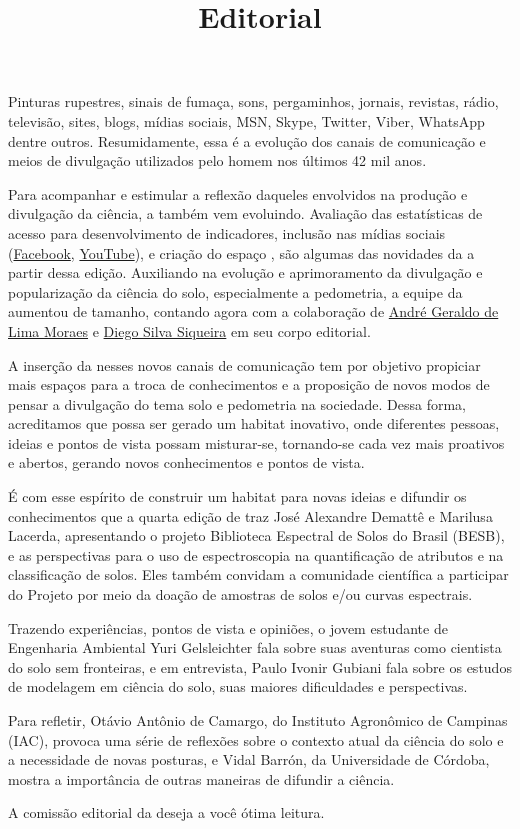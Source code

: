\title{Editorial}
\maketitle

Pinturas rupestres, sinais de fumaça, sons, pergaminhos, jornais, revistas, rádio, televisão, sites, blogs, mídias sociais, MSN, Skype, Twitter, Viber, WhatsApp dentre outros. Resumidamente, essa é a evolução dos canais de comunicação e meios de divulgação utilizados pelo homem nos últimos 42 mil anos. 

Para acompanhar e estimular a reflexão daqueles envolvidos na produção e divulgação da ciência, a \pedometria{} também vem evoluindo. Avaliação das estatísticas de acesso para desenvolvimento de indicadores, inclusão nas mídias sociais (\href{https://www.facebook.com/pedometrianews?fref=ts}{Facebook}, \href{https://www.youtube.com/channel/UCWf449Ctv5X5cZqYXmAojUg}{YouTube}), e criação do espaço \pedoartemetria, são algumas das novidades da \pedometria{} a partir dessa edição. Auxiliando na evolução e aprimoramento da divulgação e popularização da ciência do solo, especialmente a pedometria, a equipe da \pedometria{} aumentou de tamanho, contando agora com a colaboração de \href{http://lattes.cnpq.br/4230318899238716}{André Geraldo de Lima Moraes} e \href{http://lattes.cnpq.br/8836609544198735}{Diego Silva Siqueira} em seu corpo editorial.

A inserção da \pedometria{} nesses novos canais de comunicação tem por objetivo propiciar mais espaços para a troca de conhecimentos e a proposição de novos modos de pensar a divulgação do tema solo e pedometria na sociedade. Dessa forma, acreditamos que possa ser gerado um habitat inovativo, onde diferentes pessoas, ideias e pontos de vista possam misturar-se, tornando-se cada vez mais proativos e abertos, gerando novos conhecimentos e pontos de vista.

É com esse espírito de construir um habitat para novas ideias e difundir os conhecimentos que a quarta edição de \pedometria{} traz José Alexandre Demattê e Marilusa Lacerda, apresentando o projeto Biblioteca Espectral de Solos do Brasil (BESB), e as perspectivas para o uso de espectroscopia na quantificação de atributos e na classificação de solos. Eles também convidam a comunidade científica a participar do Projeto por meio da doação de amostras de solos e/ou curvas espectrais.

Trazendo experiências, pontos de vista e opiniões, o jovem estudante de Engenharia Ambiental Yuri Gelsleichter fala sobre suas aventuras como cientista do solo sem fronteiras, e em entrevista, Paulo Ivonir Gubiani fala sobre os estudos de modelagem em ciência do solo, suas maiores dificuldades e perspectivas.

Para refletir, Otávio Antônio de Camargo, do Instituto Agronômico de Campinas (IAC), provoca uma série de reflexões sobre o contexto atual da ciência do solo e a necessidade de novas posturas, e Vidal Barrón, da Universidade de Córdoba, mostra a importância de outras maneiras de difundir a ciência.

A comissão editorial da \pedometria{} deseja a você ótima leitura.

